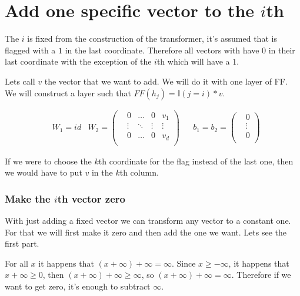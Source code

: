 \section*{Add one specific vector to the $i$th}

The $i$ is fixed from the construction of the transformer, it's assumed that is flagged with a $1$ in the last coordinate. 
Therefore all vectors with have $0$ in their last coordinate with the exception of the $i$th which will have a $1$.

Lets call $v$ the vector that we want to add. We will do it with one layer of FF. We will construct a layer such that $FF(h_j) = \mathbb{I}(j=i)*v$.

\begin{align*}
    & W_1 = id
    & W_2  = \left(\begin{matrix}
        & 0         &\dots  &0      & v_1       \\
        & \vdots    &\ddots &\vdots & \vdots    \\
        & 0         &\dots  &0      & v_d       \\
    \end{matrix}\right) &
    & b_1 = b_2 = \left(\begin{matrix}
        & 0      \\
        & \vdots \\
        & 0      \\
    \end{matrix}\right) 
\end{align*}

If we were to choose the $k$th coordinate for the flag instead of the last one, then we would have to put $v$ in the $k$th column.

\subsubsection*{Make the $i$th vector zero}

With just adding a fixed vector we can transform any vector to a constant one. For that we will first make it zero and then add the one we want. Lets see the first part.

For all $x$ it happens that $(x + \infty) + \infty = \infty$. Since $x \ge -\infty$, it happens that $x + \infty \ge 0$, then $(x + \infty) + \infty \ge \infty$, so $(x + \infty) + \infty = \infty$. Therefore if we want to get zero, it's enough to subtract $\infty$.


